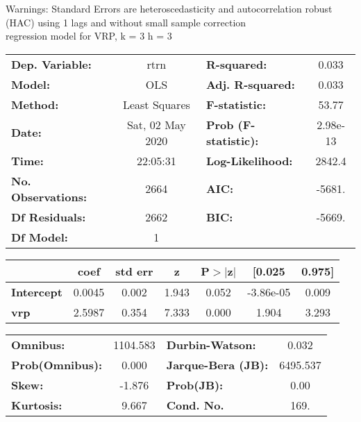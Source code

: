 Warnings: \newline
 [1] Standard Errors are heteroscedasticity and autocorrelation robust (HAC) using 1 lags and without small sample correction\\ 

regression model for VRP, k = 3 h = 3\begin{center}
\begin{tabular}{lclc}
\toprule
\textbf{Dep. Variable:}    &       rtrn       & \textbf{  R-squared:         } &     0.033   \\
\textbf{Model:}            &       OLS        & \textbf{  Adj. R-squared:    } &     0.033   \\
\textbf{Method:}           &  Least Squares   & \textbf{  F-statistic:       } &     53.77   \\
\textbf{Date:}             & Sat, 02 May 2020 & \textbf{  Prob (F-statistic):} &  2.98e-13   \\
\textbf{Time:}             &     22:05:31     & \textbf{  Log-Likelihood:    } &    2842.4   \\
\textbf{No. Observations:} &        2664      & \textbf{  AIC:               } &    -5681.   \\
\textbf{Df Residuals:}     &        2662      & \textbf{  BIC:               } &    -5669.   \\
\textbf{Df Model:}         &           1      & \textbf{                     } &             \\
\bottomrule
\end{tabular}
\begin{tabular}{lcccccc}
                   & \textbf{coef} & \textbf{std err} & \textbf{z} & \textbf{P$> |$z$|$} & \textbf{[0.025} & \textbf{0.975]}  \\
\midrule
\textbf{Intercept} &       0.0045  &        0.002     &     1.943  &         0.052        &    -3.86e-05    &        0.009     \\
\textbf{vrp}       &       2.5987  &        0.354     &     7.333  &         0.000        &        1.904    &        3.293     \\
\bottomrule
\end{tabular}
\begin{tabular}{lclc}
\textbf{Omnibus:}       & 1104.583 & \textbf{  Durbin-Watson:     } &    0.032  \\
\textbf{Prob(Omnibus):} &   0.000  & \textbf{  Jarque-Bera (JB):  } & 6495.537  \\
\textbf{Skew:}          &  -1.876  & \textbf{  Prob(JB):          } &     0.00  \\
\textbf{Kurtosis:}      &   9.667  & \textbf{  Cond. No.          } &     169.  \\
\bottomrule
\end{tabular}
\end{center}

